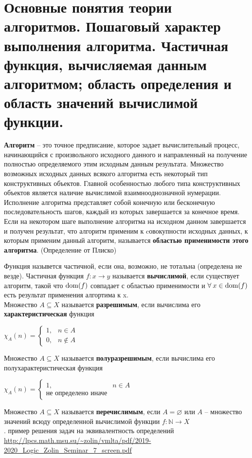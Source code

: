 \section{Основные понятия теории алгоритмов. Пошаговый характер выполнения алгоритма. Частичная функция,
вычисляемая данным алгоритмом; область определения и область значений вычислимой функции.}
\begin{definition}{
	\textbf{Алгоритм} -- это точное предписание, которое задает вычислительный процесс, начинающийся с
	произвольного исходного данного и направленный на получение полностью определяемого этим исходным данным
	результата. Множество возможных исходных данных всякого алгоритма есть некоторый тип конструктивных объектов.
	Главной особенностью любого типа конструктивных объектов является наличие вычислимой взаимнооднозначной
	нумерации. Исполнение алгоритма представляет собой конечную или бесконечную последовательность шагов, каждый из
	которых завершается за конечное время. Если на некотором шаге выполнение алгоритма на исходном данном
	завершается и получен результат, что алгоритм применим к cовокупности исходных данных, к которым применим
	данный алгоритм, называется \textbf{областью применимости этого алгоритма}. (Определение от Плиско)
  }
\end{definition}
Функция назывется частичной, если она, возможно, не тотальна (определена не везде). Частичная функция $f\colon x\to
y$ называется \textbf{вычислимой}, если существует алгоритм, такой что $\operatorname{dom}(f)$ совпадает с областью
применимости и $\forall \:x\in\operatorname{dom}(f)$ есть результат применения алгортима к x.\\
Множество $A\subseteq X$ называется \textbf{разрешимым}, если вычислима его \textbf{характеристическая} функция
\begin{center}
    $\chi_{A}(n)=\left\{\begin{array}{ll}
    {1,} & {n \in A} \\
    {0,} & {n \notin A}
    \end{array}\right.$
\end{center}
Множество $A\subseteq X$ называется \textbf{полуразрешимым}, если вычислима его полухарактеристическая функция 
    \begin{center}
        $\chi_{A}(n)=\left\{\begin{array}{ll}
        {1,} & {n \in A} \\
        \text{не определено иначе}
        \end{array}\right.$
    \end{center}
Множество $A\subseteq X$ называется \textbf{перечислимым}, если $A=\varnothing$ или $A$ -- множество значений всюду
определенной вычислимой функции $f\colon\mathbb{N}\rightarrow X$\\.
\textcolor{mygray}{пример решения задач на эквивалентность определений
\url{http://lpcs.math.msu.su/~zolin/vmlta/pdf/2019-2020_Logic_Zolin_Seminar_7_screen.pdf}}
